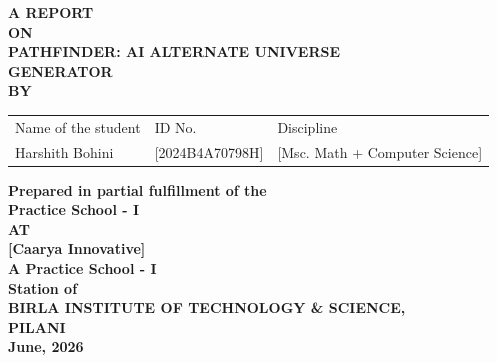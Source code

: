 \documentclass[12pt,a4paper]{report}
\begin{document}
\begin{titlepage}
    \centering
    \vspace*{1cm}
    
    {\Large \textbf{A REPORT}}\\[0.5cm]
    {\Large \textbf{ON}}\\[0.5cm]
    {\Large \textbf{PATHFINDER: AI ALTERNATE UNIVERSE\\ GENERATOR}}\\[2cm]
    
    {\large \textbf{BY}}\\[1cm]
    
    \begin{table}[h]
        \centering
        \begin{tabular}{lll}
        Name of the student & ID No. & Discipline \\
        Harshith Bohini & [2024B4A70798H] & [Msc. Math + Computer Science] \\
        \end{tabular}
    \end{table}
    
    \vspace{2.5cm}
    
    {\large \textbf{Prepared in partial fulfillment of the}}\\
    {\large \textbf{Practice School - I}}\\[1.5cm]
    
    {\large \textbf{AT}}\\[1.5cm]
    
    {\large \textbf{[Caarya Innovative]}}\\
    {\large \textbf{A Practice School - I}}\\
    {\large \textbf{Station of}}\\[1.5cm]
    
    {\large \textbf{BIRLA INSTITUTE OF TECHNOLOGY \& SCIENCE,}}\\
    {\large \textbf{PILANI}}\\[0.5cm]
    {\large \textbf{June, 2026}}
\end{titlepage}
\end{document}

